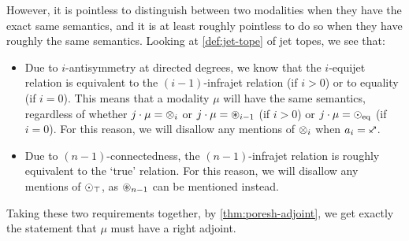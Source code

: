\documentclass[a4paper]{memoir}
\begin{document}
However, it is pointless to distinguish between two modalities when they have the exact same semantics, and it is at least roughly pointless to do so when they have roughly the same semantics.
Looking at \cref{def:jet-tope} of jet topes, we see that:
\begin{itemize}
	\item Due to $i$-antisymmetry at directed degrees, we know that the $i$-equijet relation is equivalent to the $(i-1)$-infrajet relation (if $i > 0$) or to equality (if $i = 0$).
	This means that a modality $\mu$ will have the same semantics, regardless of whether $j \cdot \mu = {\otimes}_i$ or $j \cdot \mu = {\oast}_{i-1}$ (if $i > 0$) or $j \cdot \mu = {\odot}_{\mathrm{eq}}$ (if $i = 0$).
	For this reason, we will disallow any mentions of ${\otimes}_i$ when $a_i = \ypolar$.
	
	\item Due to $(n-1)$-connectedness, the $(n-1)$-infrajet relation is roughly equivalent to the `true' relation.
	For this reason, we will disallow any mentions of ${\odot}_\top$, as ${\oast}_{n-1}$ can be mentioned instead.
\end{itemize}
Taking these two requirements together, by \cref{thm:poresh-adjoint}, we get exactly the statement that $\mu$ must have a right adjoint.
\end{document}
